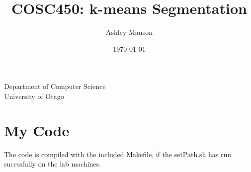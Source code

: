 \documentclass{article}
\begin{document}
\title{COSC450: k-means Segmentation}
\author{Ashley Manson}
\date{\today}

\begin{titlepage}
\clearpage
\maketitle
\thispagestyle{empty} %

\begin{center}

\vspace*{1\baselineskip} %

Department of Computer Science\\
University of Otago

\end{center}

\end{titlepage}


\section{My Code}
The code is compiled with the included Makefile, if the setPath.sh has run
sucessfully on the lab machines.\\ 
\end{document}
